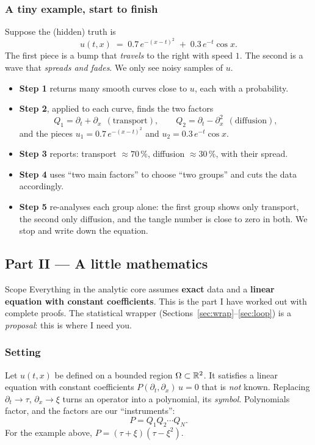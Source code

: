 \subsubsection*{A tiny example, start to finish}
Suppose the (hidden) truth is
\[
u(t,x)\;=\;0.7\,e^{-(x-t)^2}\;+\;0.3\,e^{-t}\cos x .
\]
The first piece is a bump that \emph{travels} to the right with speed $1$. The second is a wave that \emph{spreads and fades}. We only see noisy samples of $u$.
\begin{itemize}[nosep]
\item \textbf{Step 1} returns many smooth curves close to $u$, each with a probability.
\item \textbf{Step 2}, applied to each curve, finds the two factors
\[
Q_1=\partial_t+\partial_x\ \ (\text{transport}),\qquad Q_2=\partial_t-\partial_x^2\ \ (\text{diffusion}),
\]
and the pieces $u_1=0.7\,e^{-(x-t)^2}$ and $u_2=0.3\,e^{-t}\cos x$.
\item \textbf{Step 3} reports: transport $\approx 70\,\%$, diffusion $\approx 30\,\%$, with their spread.
\item \textbf{Step 4} uses ``two main factors'' to choose ``two groups'' and cuts the data accordingly.
\item \textbf{Step 5} re-analyses each group alone: the first group shows only transport, the second only diffusion, and the tangle number is close to zero in both. We stop and write down the equation.
\end{itemize}

\subsection*{Part II --- A little mathematics}

\begin{notebox}{Scope}
Everything in the analytic core assumes \textbf{exact} data and a \textbf{linear equation with constant coefficients}. This is the part I have worked out with complete proofs. The statistical wrapper (Sections~\ref{sec:wrap}--\ref{sec:loop}) is a \emph{proposal}: this is where I need you.
\end{notebox}

\subsubsection{Setting}
Let $u(t,x)$ be defined on a bounded region $\Omega\subset\mathbb{R}^2$. It satisfies a linear equation with constant coefficients $P(\partial_t,\partial_x)\,u=0$ that is \emph{not} known. Replacing $\partial_t\to\tau$, $\partial_x\to\xi$ turns an operator into a polynomial, its \emph{symbol}. Polynomials factor, and the factors are our ``instruments'':
\[
P=Q_1Q_2\cdots Q_N .
\]
For the example above, $P=(\tau+\xi)(\tau-\xi^2)$.

